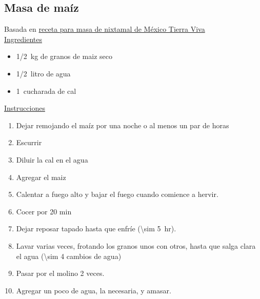 \subsection{Masa de maíz}
\label{receta:masa-maiz}

Basada en \href{https://mexicotierraviva.org/con-maiz-masa-de-nixtamal/}{receta para masa de nixtamal de México Tierra Viva}\\

\underline{Ingredientes}
\begin{itemize}
\item \SI{1/2}{kg} de granos de maiz seco
\item \SI{1/2}{litro} de agua
\item \SI{1}{cucharada} de cal
\end{itemize}

\underline{Instrucciones}
\begin{enumerate}
\item Dejar remojando el maíz por una noche o al menos un par de horas
\item Escurrir
\item Diluir la cal en el agua
\item Agregar el maiz
\item Calentar a fuego alto y bajar el fuego cuando comience a hervir.
\item Cocer por 20 min
\item Dejar reposar tapado hasta que enfríe (\SI{\sim 5}{hr}).
\item Lavar varias veces, frotando los granos unos con otros, hasta que salga clara el agua (\num{\sim 4} cambios de agua)
\item Pasar por el molino 2 veces.
\item Agregar un poco de agua, la necesaria, y amasar.
\end{enumerate}

